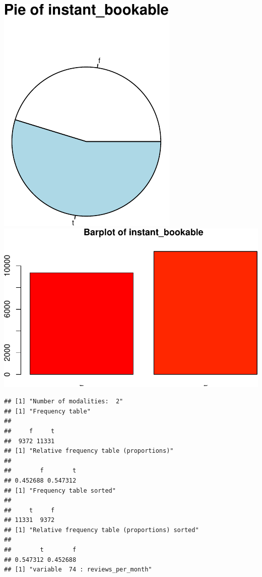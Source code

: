 \includegraphics{anal_files/figure-latex/unnamed-chunk-7-56.pdf}
\includegraphics{anal_files/figure-latex/unnamed-chunk-7-57.pdf}

\begin{verbatim}
## [1] "Number of modalities:  2"
## [1] "Frequency table"
## 
##     f     t 
##  9372 11331 
## [1] "Relative frequency table (proportions)"
## 
##        f        t 
## 0.452688 0.547312 
## [1] "Frequency table sorted"
## 
##     t     f 
## 11331  9372 
## [1] "Relative frequency table (proportions) sorted"
## 
##        t        f 
## 0.547312 0.452688 
## [1] "variable  74 : reviews_per_month"
\end{verbatim}

